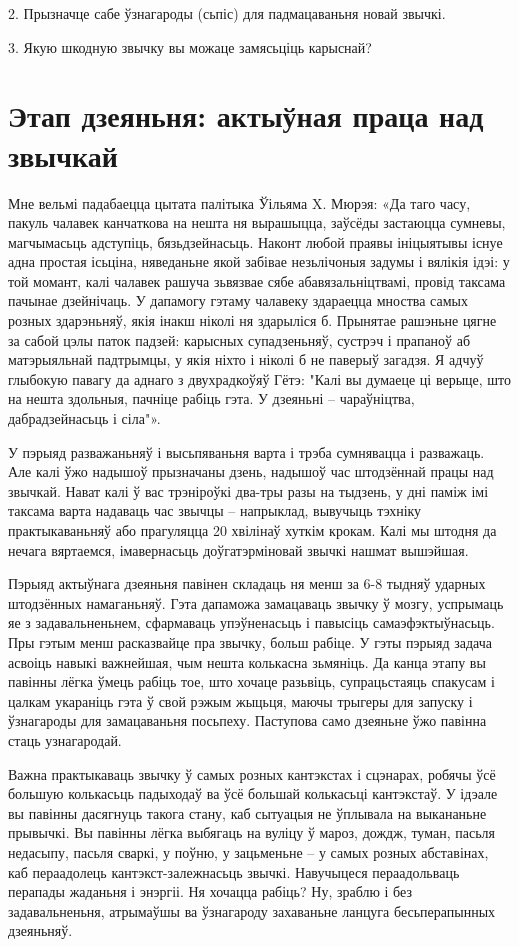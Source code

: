 2. Прызначце сабе ўзнагароды (сьпіс) для падмацаваньня новай звычкі.

3. Якую шкодную звычку вы можаце замясьціць карыснай?


\section{Этап дзеяньня: актыўная праца над звычкай}

Мне вельмі падабаецца цытата палітыка Ўільяма X. Мюрэя: «Да таго часу, пакуль чалавек канчаткова на нешта ня вырашыцца, заўсёды застаюцца сумневы, магчымасьць адступіць, бязьдзейнасьць. Наконт любой праявы ініцыятывы існуе адна простая ісьціна, няведаньне якой забівае незьлічоныя задумы і вялікія ідэі: у той момант, калі чалавек рашуча зьвязвае сябе абавязальніцтвамі, провід таксама пачынае дзейнічаць. У дапамогу гэтаму чалавеку здараецца мноства самых розных здарэньняў, якія інакш ніколі ня здарыліся б. Прынятае рашэньне цягне за сабой цэлы паток падзей: карысных супадзеньняў, сустрэч і прапаноў аб матэрыяльнай падтрымцы, у якія ніхто і ніколі б не паверыў загадзя. Я адчуў глыбокую павагу да аднаго з двухрадкоўяў Гётэ: "Калі вы думаеце ці верыце, што на нешта здольныя, пачніце рабіць гэта. У дзеяньні – чараўніцтва, дабрадзейнасьць і сіла"».

У пэрыяд разважаньняў і высьпяваньня варта і трэба сумнявацца і разважаць. Але калі ўжо надышоў прызначаны дзень, надышоў час штодзённай працы над звычкай. Нават калі ў вас трэніроўкі два-тры разы на тыдзень, у дні паміж імі таксама варта надаваць час звычцы – напрыклад, вывучыць тэхніку практыкаваньняў або прагуляцца 20 хвілінаў хуткім крокам. Калі мы штодня да нечага вяртаемся, імавернасьць доўгатэрміновай звычкі нашмат вышэйшая.

Пэрыяд актыўнага дзеяньня павінен складаць ня менш за 6-8 тыдняў ударных штодзённых намаганьняў. Гэта дапаможа замацаваць звычку ў мозгу, успрымаць яе з задавальненьнем, сфармаваць упэўненасьць і павысіць самаэфэктыўнасьць. Пры гэтым менш расказвайце пра звычку, больш рабіце. У гэты пэрыяд задача асвоіць навыкі важнейшая, чым нешта колькасна зьмяніць. Да канца этапу вы павінны лёгка ўмець рабіць тое, што хочаце разьвіць, супрацьстаяць спакусам і цалкам укараніць гэта ў свой рэжым жыцьця, маючы трыгеры для запуску і ўзнагароды для замацаваньня посьпеху. Паступова само дзеяньне ўжо павінна стаць узнагародай.

Важна практыкаваць звычку ў самых розных кантэкстах і сцэнарах, робячы ўсё большую колькасьць падыходаў ва ўсё большай колькасьці кантэкстаў. У ідэале вы павінны дасягнуць такога стану, каб сытуацыя не ўплывала на выкананьне прывычкі. Вы павінны лёгка выбягаць на вуліцу ў мароз, дождж, туман, пасьля недасыпу, пасьля сваркі, у поўню, у зацьменьне – у самых розных абставінах, каб пераадолець кантэкст-залежнасьць звычкі. Навучыцеся пераадольваць перапады жаданьня і энэргіі. Ня хочацца рабіць? Ну, зраблю і без задавальненьня, атрымаўшы ва ўзнагароду захаваньне ланцуга бесьперапынных дзеяньняў.

